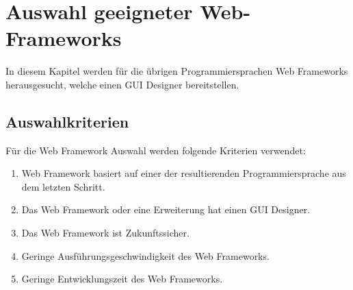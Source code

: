 \documentclass[ngerman]{article}
\begin{document}
    \section{Auswahl geeigneter Web-Frameworks}
    \label{AuswahlFrameworks}
    In diesem Kapitel werden für die übrigen Programmiersprachen Web Frameworks herausgesucht, welche einen GUI Designer bereitstellen.
    \subsection{Auswahlkriterien}
    Für die Web Framework Auswahl werden folgende Kriterien verwendet:
    \begin{enumerate}
        \item Web Framework basiert auf einer der resultierenden Programmiersprache aus dem letzten Schritt.
        \item Das Web Framework oder eine Erweiterung hat einen GUI Designer.
        \item Das Web Framework ist Zukunftssicher.
        \item Geringe Ausführungsgeschwindigkeit des Web Frameworks.
        \item Geringe Entwicklungszeit des Web Frameworks.
    \end{enumerate}
\end{document}
